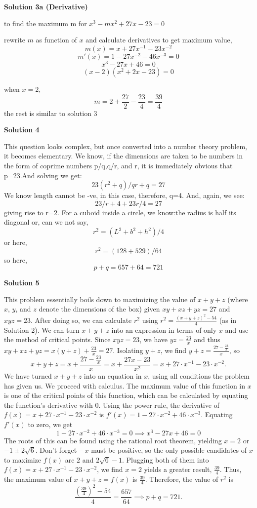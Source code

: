 \begin{enumerate}
 



\textbf{Solution 3a (Derivative)}

to find the maximum m for $x^3-mx^2+27x-23=0$

 rewrite $m$ as function of $x$ and calculate derivatives to get maximum value, 
 \[m(x) =x + 27x^{-1} - 23x^{-2}\]
 \[m'(x) = 1 - 27x^{-2} -46x^{-3} = 0\]
 \[x^3 -27x+46=0\]
 \[(x-2)(x^2+2x-23)=0\]

 when $x = 2$, 
 \[m= 2 + \frac{27}{2}  - \frac{23}{4}  = \frac{39}{4}\]the rest is similar to solution 3

 



\textbf{Solution 4}

This question looks complex, but once converted into a number theory problem, it becomes elementary. We know, if the dimensions are taken to be numbers in the form of coprime numbers p/q,q/r, and r, it is immediately obvious that p=23.And solving we get: 
 \[23(r^2+q)/qr+q=27\] We know length cannot be -ve, in this case, therefore, q=4. And, again, we see:
 \[23/r+4+23r/4=27\] giving rise to r=2. For a cuboid inside a circle, we know:the radius is half its diagonal or, can we not say, 
 \[r^2=(L^2+b^2+h^2)/4\]or  here,
 \[r^2=(128+529)/64\]so here, 
 \[p+q=657+64=721\]




\textbf{Solution 5}

This problem essentially boils down to maximizing the value of $x+y+z$ (where $x$, $y$, and $z$ denote the dimensions of the box) given $xy+xz+yz=27$ and $xyz=23$. After doing so, we can calculate $r^2$ using $r^2=\frac{(x+y+z)^2-54}{4}$ (as in Solution 2). We can turn $x+y+z$ into an expression in terms of only $x$ and use the method of critical points. Since $xyz=23$, we have $yz=\frac{23}{x}$ and thus $xy+xz+yz=x(y+z)+\frac{23}{x}=27$. Isolating $y+z$, we find $y+z=\frac{27-\frac{23}{x}}{x}$, so
 \[x+y+z=x+\frac{27-\frac{23}{x}}{x}=x+\frac{27x-23}{x^2}=x+27\cdot x^{-1}-23\cdot x^{-2}.\]We have turned $x+y+z$ into an equation in $x$, using all conditions the problem has given us. We proceed with calculus. The maximum value of this function in $x$ is one of the critical points of this function, which can be calculated by equating the function's derivative with $0$. Using the power rule, the derivative of $f(x)=x+27\cdot x^{-1}-23\cdot x^{-2}$ is $f'(x)=1-27\cdot x^{-2}+46\cdot x^{-3}$. Equating $f'(x)$ to zero, we get
 \[1-27\cdot x^{-2}+46\cdot x^{-3}=0 \implies x^3-27x+46=0\]The roots of this can be found using the rational root theorem, yielding $x=2$ or $-1\pm 2\sqrt{6}$. Don't forget -- $x$ must be positive, so the only possible candidates of $x$ to maximize $f(x)$ are $2$ and $2\sqrt{6}-1$. Plugging both of them into $f(x)=x+27\cdot x^{-1}-23\cdot x^{-2}$, we find $x=2$ yields a greater result, $\frac{39}{4}$. Thus, the maximum value of $x+y+z=f(x)$ is $\frac{39}{4}$. Therefore, the value of $r^2$ is
 \[\frac{(\frac{39}{4})^2-54}{4}=\frac{657}{64} \implies p+q=\boxed{721}.\]





\end{enumerate}

